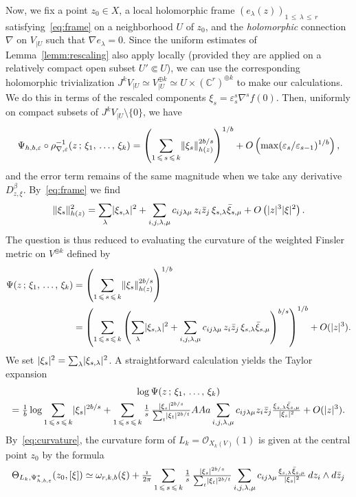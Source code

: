 \documentclass[AHL,Unicode,longabstracts,published]{cedram}
\DeclarePairedDelimiter{\abs}{\lvert}{\rvert}
\DeclarePairedDelimiter{\Abs}{\lVert}{\rVert}
\newcommand*\cO{\mathcal{O}}
\newcommand*\bC{\mathbb{C}}
\let\leq\leqslant
\begin{document}
Now, we fix a point $z_0\in X$, a local holomorphic frame
$(e_\lambda(z))_{1\,\leq\,\lambda\,\leq\,r}$ satisfying~\eqref{eq:frame} on a neighborhood $U$ of $z_0$, and the \emph{holomorphic} connection $\nabla$ on $V_{|U}$ such that
$\nabla e_\lambda=0$. Since the uniform estimates of Lemma~\ref{lemm:rescaling} also apply locally (provided they are applied on a relatively compact open subset $U'\Subset U$), we can use the corresponding holomorphic trivialization
$J^kV_{|U}\simeq V_{|U}^{\oplus k}\simeq U\times(\bC^r)^{\oplus k}$ to make our calculations. We do this in terms of the rescaled components $\xi_s=\varepsilon_s^s\nabla^sf(0)$. Then, uniformly on compact subsets of $J^kV_{|U}\setminus\{0\}$, we have
\[
\Psi_{h,b,\varepsilon}\circ\rho_{\nabla,\varepsilon}^{-1}(z\,;\,\xi_1,\,\dotsc,\,\xi_k) =\left(\sum_{1\,\leq\,s\,\leq\,k}\Abs{\xi_s}^{2b/s}_{h(z)}\right)^{1/b} +O\left(\max(\varepsilon_s/\varepsilon_{s-1})^{1/b}\right),
\]
and the error term remains of the same magnitude when we take any derivative $D_{z,\xi}^\beta$. By~\eqref{eq:frame} we find
\[
\Abs{\xi_s}_{h(z)}^2=
\sum_\lambda\abs{\xi_{s,\lambda}}^2+
\sum_{i,j,\lambda,\mu}c_{ij\lambda\mu}\,z_i\bar z_j
\,\xi_{s,\lambda}\bar \xi_{s,\mu}+O\left(\abs{z}^3\abs{\xi}^2\right).
\]
The question is thus reduced to evaluating the curvature of the weighted Finsler metric on $V^{\oplus k}$ defined by
\begin{align*}
\Psi(z\,;\,\xi_1,\,\dotsc,\,\xi_k) &=\left(\sum_{1\,\leq\,s\,\leq\,k}\Abs{\xi_s}^{2b/s}_{h(z)}\right)^{1/b}
\\
&=\left(\sum_{1\,\leq\,s\,\leq\,k}\left(\sum_\lambda\abs{\xi_{s,\lambda}}^2+
\sum_{i,j,\lambda,\mu}c_{ij\lambda\mu}\,z_i\bar z_j\,
\xi_{s,\lambda}\bar\xi_{s,\mu}\right)^{b/s}\right)^{1/b}+O(\abs{z}^3).
\end{align*}
We set $\abs{\xi_s}^2=\sum_\lambda\abs{\xi_{s,\lambda}}^2$. A straightforward calculation yields the Taylor expansion
\begin{multline*}
\log\Psi(z\,;\,\xi_1,\,\dotsc,\,\xi_k)\\
=\tfrac{1}{ b}\log\sum_{1\,\leq\,s\,\leq\,k}\abs{\xi_s}^{2b/s}+
\sum_{1\,\leq\,s\,\leq\,k}\tfrac{1}{ s}\,\tfrac{\abs{\xi_s}^{2b/s}}{ \sum_t\abs{\xi_t}^{2b/t}}AAa
\sum_{i,j,\lambda,\mu}c_{ij\lambda\mu}z_i\bar z_j
\tfrac{\xi_{s,\lambda}\bar\xi_{s,\mu}}{\abs{\xi_s}^2}+O(\abs{z}^3).
\end{multline*}
By~\eqref{eq:curvature}, the curvature form of $L_k=\cO_{X_k(V)}(1)$ is given at the central point $z_0$ by the formula
\[
\Theta_{L_k,\Psi^*_{h,b,\varepsilon}}(z_0,[\xi])\simeq
\omega_{r,k,b}(\xi)+\tfrac{\imath}{ 2\pi}
\sum_{1\,\leq\,s\,\leq\,k}\tfrac{1}{ s}\,\tfrac{\abs{\xi_s}^{2b/s}}{ \sum_t\abs{\xi_t}^{2b/t}}
\sum_{i,j,\lambda,\mu}c_{ij\lambda\mu}
\tfrac{\xi_{s,\lambda}\bar\xi_{s,\mu}}{\abs{\xi_s}^2}\,dz_i\wedge d\bar z_j
\]
\end{document}
